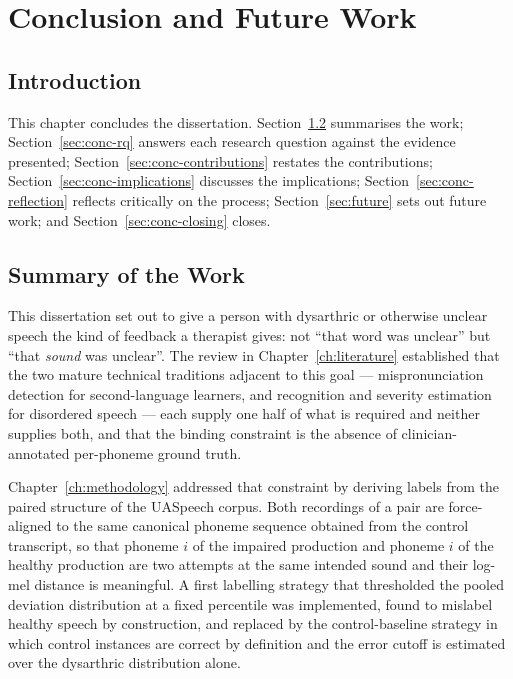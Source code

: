 \chapter{Conclusion and Future Work}
\label{ch:conclusion}

\section{Introduction}

This chapter concludes the dissertation. Section~\ref{sec:conc-summary}
summarises the work; Section~\ref{sec:conc-rq} answers each research question
against the evidence presented; Section~\ref{sec:conc-contributions} restates
the contributions; Section~\ref{sec:conc-implications} discusses the
implications; Section~\ref{sec:conc-reflection} reflects critically on the
process; Section~\ref{sec:future} sets out future work; and
Section~\ref{sec:conc-closing} closes.

\section{Summary of the Work}
\label{sec:conc-summary}

This dissertation set out to give a person with dysarthric or otherwise unclear
speech the kind of feedback a therapist gives: not ``that word was unclear'' but
``that \emph{sound} was unclear''. The review in Chapter~\ref{ch:literature}
established that the two mature technical traditions adjacent to this goal ---
mispronunciation detection for second-language learners, and recognition and
severity estimation for disordered speech --- each supply one half of what is
required and neither supplies both, and that the binding constraint is the
absence of clinician-annotated per-phoneme ground truth.

Chapter~\ref{ch:methodology} addressed that constraint by deriving labels from
the paired structure of the UASpeech corpus. Both recordings of a pair are
force-aligned to the same canonical phoneme sequence obtained from the control
transcript, so that phoneme $i$ of the impaired production and phoneme $i$ of
the healthy production are two attempts at the same intended sound and their
log-mel distance is meaningful. A first labelling strategy that thresholded the
pooled deviation distribution at a fixed percentile was implemented, found to
mislabel healthy speech by construction, and replaced by the control-baseline
strategy in which control instances are correct by definition and the error
cutoff is estimated over the dysarthric distribution alone.

